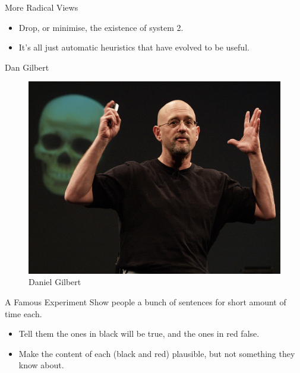\documentclass[
  17pt,
  letterpaper,
  ignorenonframetext,
  aspectratio=169,
]{beamer}
\providecommand{\tightlist}{%
  \setlength{\itemsep}{0pt}\setlength{\parskip}{0pt}}\usepackage{longtable,booktabs,array}
\begin{document}
\begin{frame}{More Radical Views}
\protect\hypertarget{more-radical-views}{}
\begin{itemize}[<+->]
\tightlist
\item
  Drop, or minimise, the existence of system 2.
\item
  It's all just automatic heuristics that have evolved to be useful.
\end{itemize}
\end{frame}

\begin{frame}{Dan Gilbert}
\protect\hypertarget{dan-gilbert}{}
\begin{figure}

{\centering \includegraphics[width=\textwidth,height=0.6\textheight]{../images/gilbert.png}

}

\caption{Daniel Gilbert}

\end{figure}
\end{frame}

\begin{frame}{A Famous Experiment}
\protect\hypertarget{a-famous-experiment}{}
Show people a bunch of sentences for short amount of time each.

\begin{itemize}[<+->]
\tightlist
\item
  Tell them the ones in black will be true, and the ones in red false.
\item
  Make the content of each (black and red) plausible, but not something
  they know about.
\end{itemize}
\end{frame}
\end{document}
